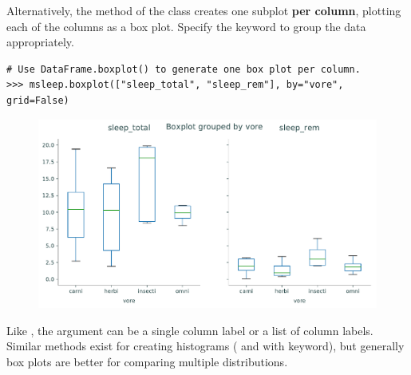 Alternatively, the  method of the  class creates one subplot \textbf{per column}, plotting each of the columns as a box plot.
Specify the  keyword to group the data appropriately.

\begin{lstlisting}
# Use DataFrame.boxplot() to generate one box plot per column.
>>> msleep.boxplot(["sleep_total", "sleep_rem"], by="vore", grid=False)
\end{lstlisting}

\begin{figure}[H]
    \centering
    \includegraphics[width=.7\textwidth]{figures/mammal_box_cols.pdf}
\end{figure}

Like , the  argument can be a single column label or a list of column labels.
Similar methods exist for creating histograms ( and  with  keyword), but generally box plots are better for comparing multiple distributions.

